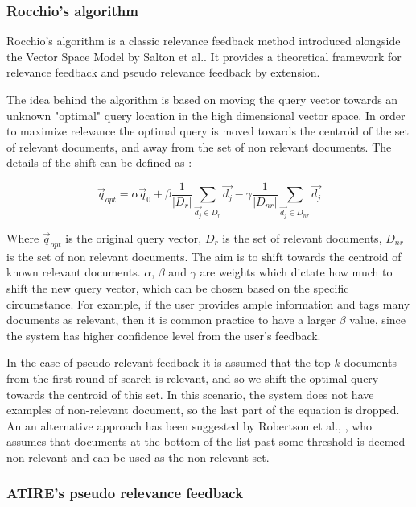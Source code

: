 \subsubsection{Rocchio's algorithm}

Rocchio’s algorithm is a classic relevance feedback method introduced alongside the Vector Space Model by Salton et al.\cite{Salton:1975:VSM:361219.361220}. It provides a theoretical framework for relevance feedback and pseudo relevance feedback by extension. 

The idea behind the algorithm is based on moving the query vector towards an unknown "optimal" query location in the high dimensional vector space. In order to maximize relevance the optimal query is moved towards the centroid of the set of relevant documents, and away from the set of non relevant documents. The details of the shift can be defined as :

\begin{equation} \label{eq:rocchio}
    \vec{q}_{opt} = \alpha \vec{q}_0 + \beta \frac{1}{|D_r|}  \sum_{\vec{d_j} \in D_r} \vec{d_j} - \gamma \frac{1}{|D_{nr}|}  \sum_{\vec{d_j} \in D_{nr}} \vec{d_j} 
\end{equation}

Where $\vec{q}_{opt}$ is the original query vector,  $D_r$ is the set of relevant documents, $D_{nr}$ is the set of non relevant documents. The aim is to shift towards the centroid of known relevant documents.  $\alpha$, $\beta$ and $\gamma$ are weights which dictate how much to shift the new query vector, which can be chosen based on the specific circumstance. For example, if the user provides ample information and tags many documents as relevant, then it is common practice to have a larger $\beta$ value, since the system has higher confidence level from the user's feedback. 

In the case of pseudo relevant feedback it is assumed that the top $k$ documents from the first round of search is relevant, and so we shift the optimal query towards the centroid of this set. In this scenario, the system does not have examples of non-relevant document, so the last part of the equation is dropped. An an alternative approach has been suggested by Robertson et al., \cite{robertson1999okapi}, who assumes that documents at the bottom of the list past some threshold is deemed non-relevant and can be used as the non-relevant set.


\subsubsection{ATIRE's pseudo relevance feedback}



